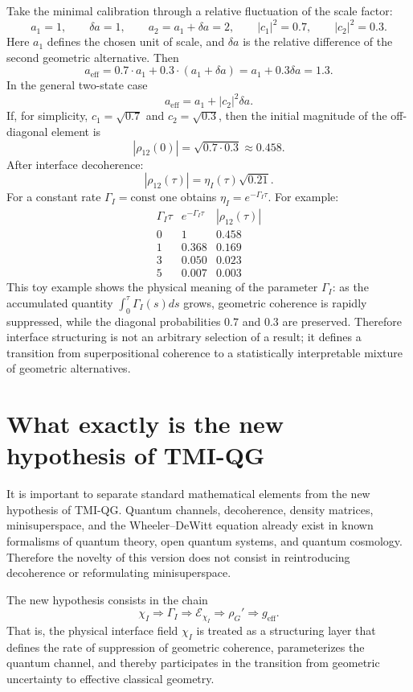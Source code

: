 \documentclass[12pt,a4paper]{article}
\newcommand{\Eff}{\mathrm{eff}}
\begin{document}
Take the minimal calibration through a relative fluctuation of the scale factor:
\[
\boxed{
a_1=1,
\qquad
\delta a=1,
\qquad
a_2=a_1+\delta a=2,
\qquad
|c_1|^2=0.7,
\qquad
|c_2|^2=0.3.
}
\]
Here $a_1$ defines the chosen unit of scale, and $\delta a$ is the relative difference of the second geometric alternative. Then
\[
\boxed{
a_{\Eff}=0.7\cdot a_1+0.3\cdot(a_1+\delta a)=a_1+0.3\delta a=1.3.
}
\]
In the general two-state case
\[
\boxed{
a_{\Eff}=a_1+|c_2|^2\delta a.
}
\]
If, for simplicity, $c_1=\sqrt{0.7}$ and $c_2=\sqrt{0.3}$, then the initial magnitude of the off-diagonal element is
\[
\boxed{
|\rho_{12}(0)|=\sqrt{0.7\cdot0.3}\approx0.458.
}
\]
After interface decoherence:
\[
\boxed{
|\rho_{12}(\tau)|=\eta_I(\tau)\sqrt{0.21}.
}
\]
For a constant rate $\Gamma_I=\mathrm{const}$ one obtains $\eta_I=e^{-\Gamma_I\tau}$. For example:
\[
\begin{array}{c|c|c}
\Gamma_I\tau & e^{-\Gamma_I\tau} & |\rho_{12}(\tau)| \\
\hline
0 & 1 & 0.458 \\
1 & 0.368 & 0.169 \\
3 & 0.050 & 0.023 \\
5 & 0.007 & 0.003
\end{array}
\]
This toy example shows the physical meaning of the parameter $\Gamma_I$: as the accumulated quantity $\int_0^\tau\Gamma_I(s)ds$ grows, geometric coherence is rapidly suppressed, while the diagonal probabilities $0.7$ and $0.3$ are preserved. Therefore interface structuring is not an arbitrary selection of a result; it defines a transition from superpositional coherence to a statistically interpretable mixture of geometric alternatives.

\section{What exactly is the new hypothesis of TMI-QG}

It is important to separate standard mathematical elements from the new hypothesis of TMI-QG. Quantum channels, decoherence, density matrices, minisuperspace, and the Wheeler--DeWitt equation already exist in known formalisms of quantum theory, open quantum systems, and quantum cosmology. Therefore the novelty of this version does not consist in reintroducing decoherence or reformulating minisuperspace.

The new hypothesis consists in the chain
\[
\boxed{
\chi_I
\Rightarrow
\Gamma_I
\Rightarrow
\mathcal E_{\chi_I}
\Rightarrow
\rho_G'
\Rightarrow
 g_{\Eff}.
}
\]
That is, the physical interface field $\chi_I$ is treated as a structuring layer that defines the rate of suppression of geometric coherence, parameterizes the quantum channel, and thereby participates in the transition from geometric uncertainty to effective classical geometry.
\end{document}
